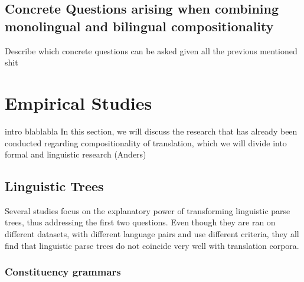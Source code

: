 \documentclass{report}
\theoremstyle{break}
\begin{document}
\subsection{Concrete Questions arising when combining monolingual and bilingual compositionality}

Describe which concrete questions can be asked given all the previous mentioned shit

\section{Empirical Studies}

intro blablabla
In this section, we will discuss the research that has already been conducted regarding compositionality of translation, which we will divide into formal and linguistic research (Anders)

\subsection{Linguistic Trees}

Several studies focus on the explanatory power of transforming linguistic parse trees, thus addressing the first two questions. Even though they are ran on different datasets, with different language pairs and use different criteria, they all find that linguistic parse trees do not coincide very well with translation corpora.

\subsubsection{Constituency grammars}
\end{document}
